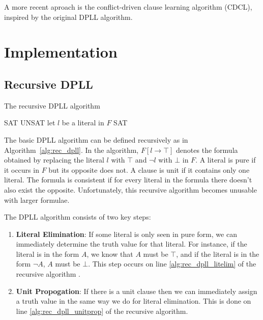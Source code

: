 \documentclass[10pt,AMS Euler]{article}
\begin{document}
A more recent aproach is the conflict-driven clause learning algorithm (CDCL), inspired by the original DPLL
algorithm. 

\section*{Implementation}
\label{sec:orga01365f}
\subsection*{Recursive DPLL}
\label{sec:org831a191}
\begin{algorithm}
\caption{The recursive DPLL algorithm}
\label{alg:rec_dpll}
\begin{algorithmic}[1]
  \State \Return SAT
  \State \Return UNSAT
 \label{alg:rec_dpll_litelim}
  \State \Return {}
 \label{alg:rec_dpll_unitprop}
  \State \Return {}
\Else
  \State let $l$ be a literal in $F$
    \State \Return SAT
  \Else
    \State \Return {}
  \EndIf
\EndIf
\EndFunction
\end{algorithmic}
\end{algorithm}

The basic DPLL algorithm can be defined recursively as in Algorithm~\ref{alg:rec_dpll}.
In the algorithm, \(F[l \to \top]\) denotes the formula obtained by replacing the literal \(l\) with \(\top\) and
\(\neg l\) with \(\bot\) in \(F\). A literal is pure if it occurs in \(F\) but its opposite does not. A clause is unit
if it contains only one literal. The formula is consistent if for every literal in the formula there doesn't
also exist the opposite. Unfortunately, this recursive algorithm becomes unusable with larger formulae.

The DPLL algorithm consists of two key steps:
\begin{enumerate}
\item \textbf{Literal Elimination}: If some literal is only seen in pure form, we can immediately determine the
truth value for that literal. For instance, if the literal is in the form \(A\), we know that \(A\) must be
\(\top\), and if the literal is in the form \(\neg A\), \(A\) must be \(\bot\). This step occurs on line
\ref{alg:rec_dpll_litelim} of the recursive algorithm .
\item \textbf{Unit Propogation}: If there is a unit clause then we can immediately assign a truth value in the same
way we do for literal elimination. This is done on line \ref{alg:rec_dpll_unitprop} of the recursive
algorithm.
\end{enumerate}
\end{document}
